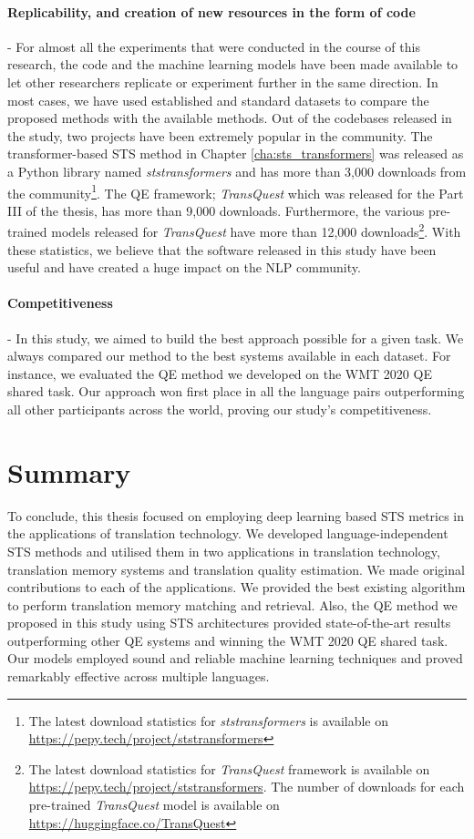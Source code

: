 \paragraph{Replicability, and creation of new resources in the form of code} - For almost all the experiments that were conducted in the course of this research, the code and the machine learning models have been made available to let other researchers replicate or experiment further in the same direction. In most cases, we have used established and standard datasets to compare the proposed methods with the available methods. Out of the codebases released in the study, two projects have been extremely popular in the community. The transformer-based STS method in Chapter \ref{cha:sts_transformers} was released as a Python library named \textit{ststransformers} and has more than 3,000 downloads from the community\footnote{The latest download statistics for \textit{ststransformers} is available on \url{https://pepy.tech/project/ststransformers}}. The QE framework; \textit{TransQuest} which was released for the Part III of the thesis, has more than 9,000 downloads. Furthermore, the various pre-trained models released for \textit{TransQuest} have more than 12,000 downloads\footnote{The latest download statistics for \textit{TransQuest} framework is available on \url{https://pepy.tech/project/ststransformers}. The number of downloads for each pre-trained \textit{TransQuest} model is available on \url{https://huggingface.co/TransQuest}}. With these statistics, we believe that the software released in this study have been useful and have created a huge impact on the NLP community.

\paragraph{Competitiveness} - In this study, we aimed to build the best approach possible for a given task. We always compared our method to the best systems available in each dataset. For instance, we evaluated the QE method we developed on the WMT 2020 QE shared task. Our approach won first place in all the language pairs outperforming all other participants across the world, proving our study's competitiveness.



\section{Summary}
To conclude, this thesis focused on employing deep learning based STS metrics in the applications of translation technology. We developed language-independent STS methods and utilised them in two applications in translation technology, translation memory systems and translation quality estimation. We made original contributions to each of the applications. We provided the best existing algorithm to perform translation memory matching and retrieval. Also, the QE method we proposed in this study using STS architectures provided state-of-the-art results outperforming other QE systems and winning the WMT 2020 QE shared task.  Our models employed sound and reliable machine learning techniques and proved remarkably effective across multiple languages.